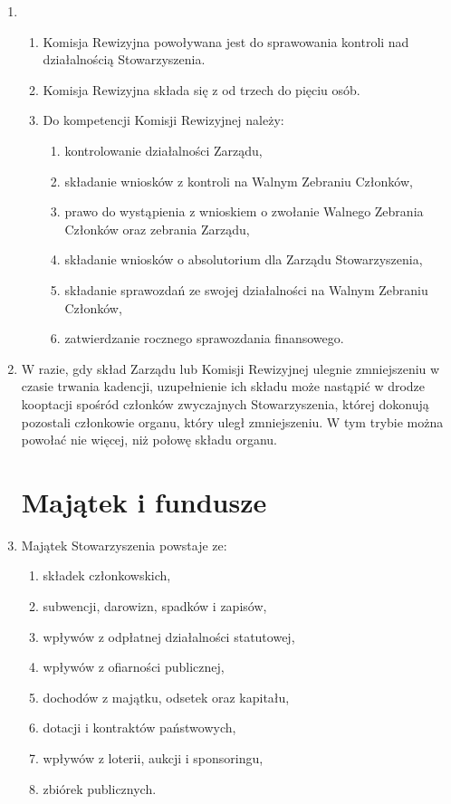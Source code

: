 \documentclass[chapterprefix,notitlepage]{article}
\begin{document}
\begin{enumerate}
	\item \begin{enumerate}
		\item Komisja Rewizyjna powoływana jest do sprawowania kontroli nad działalnością Stowarzyszenia.
		\item Komisja Rewizyjna składa się z od trzech do pięciu osób.
		\item Do kompetencji Komisji Rewizyjnej należy:
		\begin{enumerate}
			\item kontrolowanie działalności Zarządu,
			\item składanie wniosków z kontroli na Walnym Zebraniu Członków,
			\item prawo do wystąpienia z wnioskiem o zwołanie Walnego Zebrania Członków oraz zebrania Zarządu,
			\item składanie wniosków o absolutorium dla Zarządu Stowarzyszenia,
			\item składanie sprawozdań ze swojej działalności na Walnym Zebraniu Członków,
			\item zatwierdzanie rocznego sprawozdania finansowego.
		\end{enumerate}
	\end{enumerate}

	\item W razie, gdy skład Zarządu lub Komisji Rewizyjnej ulegnie zmniejszeniu w czasie trwania kadencji, uzupełnienie ich składu może nastąpić w drodze kooptacji spośród członków zwyczajnych Stowarzyszenia, której dokonują pozostali członkowie organu, który uległ zmniejszeniu. W tym trybie można powołać nie więcej, niż połowę składu organu.


\section{Majątek i fundusze}

	\item Majątek Stowarzyszenia powstaje ze:
	\begin{enumerate}[1)]
		\item składek członkowskich,
		\item subwencji, darowizn, spadków i zapisów,
		\item wpływów z odpłatnej działalności statutowej,
		\item wpływów z ofiarności publicznej,
		\item dochodów z majątku, odsetek oraz kapitału,
		\item dotacji i kontraktów państwowych,
		\item wpływów z loterii, aukcji i sponsoringu,
		\item zbiórek publicznych.
	\end{enumerate}
	

\end{enumerate}
\end{document}
